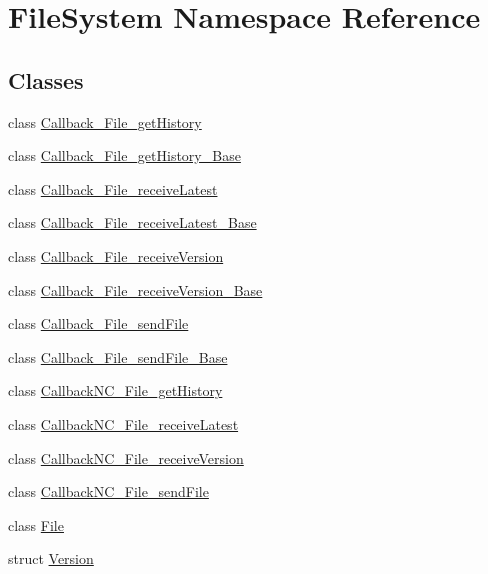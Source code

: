 \hypertarget{namespace_file_system}{}\section{File\+System Namespace Reference}
\label{namespace_file_system}
\subsection*{Classes}
\begin{DoxyCompactItemize}
\item 
class \hyperlink{class_file_system_1_1_callback___file__get_history}{Callback\+\_\+\+File\+\_\+get\+History}
\item 
class \hyperlink{class_file_system_1_1_callback___file__get_history___base}{Callback\+\_\+\+File\+\_\+get\+History\+\_\+\+Base}
\item 
class \hyperlink{class_file_system_1_1_callback___file__receive_latest}{Callback\+\_\+\+File\+\_\+receive\+Latest}
\item 
class \hyperlink{class_file_system_1_1_callback___file__receive_latest___base}{Callback\+\_\+\+File\+\_\+receive\+Latest\+\_\+\+Base}
\item 
class \hyperlink{class_file_system_1_1_callback___file__receive_version}{Callback\+\_\+\+File\+\_\+receive\+Version}
\item 
class \hyperlink{class_file_system_1_1_callback___file__receive_version___base}{Callback\+\_\+\+File\+\_\+receive\+Version\+\_\+\+Base}
\item 
class \hyperlink{class_file_system_1_1_callback___file__send_file}{Callback\+\_\+\+File\+\_\+send\+File}
\item 
class \hyperlink{class_file_system_1_1_callback___file__send_file___base}{Callback\+\_\+\+File\+\_\+send\+File\+\_\+\+Base}
\item 
class \hyperlink{class_file_system_1_1_callback_n_c___file__get_history}{Callback\+N\+C\+\_\+\+File\+\_\+get\+History}
\item 
class \hyperlink{class_file_system_1_1_callback_n_c___file__receive_latest}{Callback\+N\+C\+\_\+\+File\+\_\+receive\+Latest}
\item 
class \hyperlink{class_file_system_1_1_callback_n_c___file__receive_version}{Callback\+N\+C\+\_\+\+File\+\_\+receive\+Version}
\item 
class \hyperlink{class_file_system_1_1_callback_n_c___file__send_file}{Callback\+N\+C\+\_\+\+File\+\_\+send\+File}
\item 
class \hyperlink{class_file_system_1_1_file}{File}
\item 
struct \hyperlink{struct_file_system_1_1_version}{Version}
\end{DoxyCompactItemize}
